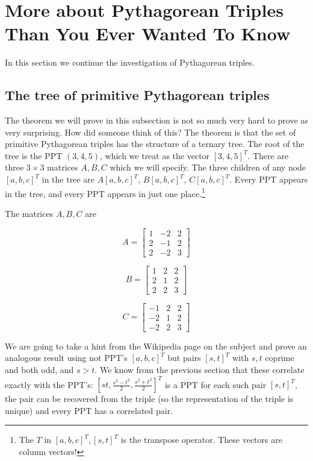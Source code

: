 \documentclass[12pt]{article}
\begin{document}
\section{More about Pythagorean Triples Than You Ever Wanted To Know}

In this section we continue the investigation of Pythagorean triples.

\subsection{The tree of primitive Pythagorean triples}

The theorem we will prove in this subsection is not so much very hard to prove as very surprising.   How did someone think of this?   The theorem is that the set of primitive Pythagorean triples has the structure of a ternary tree.   The root of the tree is the PPT $(3,4,5)$, which we treat as the vector $[3,4,5]^T$.  There are three $3 \times 3$ matrices $A,B,C$ which we will specify.   The three children of any node $[a,b,c]^T$ in the tree are $A[a,b,c]^T$, $B[a,b,c]^T$, $C[a,b,c]^T$.   Every PPT appears in the tree, and every PPT appears in just one place.\footnote{The $T$ in $[a,b,c]^T, [s,t]^T$ is the transpose operator.   These vectors are column vectors!}

The matrices $A,B,C$ are

$$A=\left[\begin{array}{ccc} 1 & -2 & 2 \\ 2 & -1 & 2\\2 & -2 & 3\end{array}\right]$$

$$B=\left[\begin{array}{ccc} 1 & 2 & 2 \\ 2 & 1 & 2\\2 & 2 & 3\end{array}\right]$$

$$C=\left[\begin{array}{ccc} -1 & 2 & 2 \\ -2 & 1 & 2\\-2 & 2 & 3\end{array}\right]$$

We are going to take a hint from the Wikipedia page on the subject and prove an analogous result using not PPT's $[a,b,c]^T$ but pairs $[s,t]^T$ with $s,t$ coprime and both odd, and $s>t$.  We know from the previous section that these correlate exactly with the PPT's:  $[st,\frac{s^2-t^2}2,\frac{s^2+t^2}2]^T$ is a PPT for each such pair $[s,t]^T$, the pair can be recovered
from the triple (so the representation of the triple is unique) and every PPT has a correlated pair.
\end{document}
